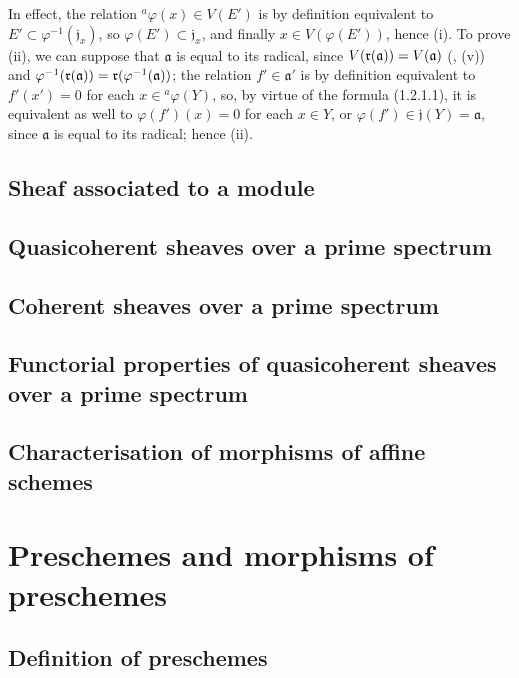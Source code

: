 \documentclass{book}
\begin{document}
In effect, the relation $^a\varphi(x)\in V(E')$ is by definition equivalent to
$E'\subset\varphi^{-1}(\mathfrak{j}_x)$, so $\varphi(E')\subset\mathfrak{j}_x$, and
finally $x\in V(\varphi(E'))$, hence (i). To prove (ii), we can suppose that
$\mathfrak{a}$ is equal to its radical, since $V(\mathfrak{r}(\mathfrak{a}))=V(\mathfrak{a})$
(, (v)) and
$\varphi^{-1}(\mathfrak{r}(\mathfrak{a}))=\mathfrak{r}(\varphi^{-1}(\mathfrak{a}))$; the relation
$f'\in\mathfrak{a}'$ is by definition equivalent to $f'(x')=0$ for each
$x\in{^a\varphi(Y)}$, so, by virtue of the formula (1.2.1.1), it is equivalent as well
to $\varphi(f')(x)=0$ for each $x\in Y$, or $\varphi(f')\in\mathfrak{j}(Y)=\mathfrak{a}$,
since $\mathfrak{a}$ is equal to its radical; hence (ii).

\subsection{Sheaf associated to a module}
\label{1-schemes-1.3}

\subsection{Quasicoherent sheaves over a prime spectrum}
\label{1-schemes-1.4}

\subsection{Coherent sheaves over a prime spectrum}
\label{1-schemes-1.5}

\subsection{Functorial properties of quasicoherent sheaves over a prime spectrum}
\label{1-schemes-1.6}

\subsection{Characterisation of morphisms of affine schemes}
\label{1-schemes-1.7}

\section{Preschemes and morphisms of preschemes}
\label{1-schemes-2}

\subsection{Definition of preschemes}
\label{1-schemes-2.1}
\end{document}

